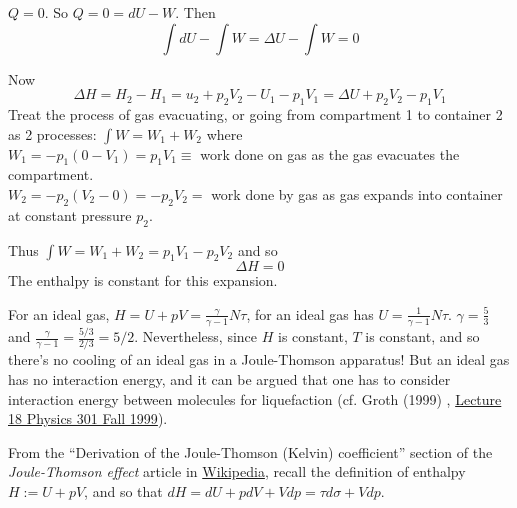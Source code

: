 \documentclass[10pt]{amsart}
\begin{document}
\begin{multicols*}{2}
$Q=0$.  So $Q=0 = dU -W$.  Then
\[
\int dU - \int W = \Delta U - \int W = 0 
\]

Now
\[
\Delta H = H_2 - H_1 = u_2 + p_2 V_2 - U_1 - p_1 V_1 = \Delta U + p_2 V_2 - p_1 V_1 
\]
Treat the process of gas evacuating, or going from compartment 1 to container 2 as 2 processes:  $\int W = W_1 + W_2$ where \\
$W_1 = -p_1 (0-V_1) = p_1 V_1 \equiv $ work done on gas as the gas evacuates the compartment. \\
$W_2 = -p_2(V_2-0) = -p_2 V_2 = $ work done by gas as gas expands into container at constant pressure $p_2$.  

Thus $\int W = W_1 + W_2 = p_1 V_1 - p_2 V_2$ and so 
\[
\boxed{ \Delta H = 0 }
\]
The enthalpy is constant for this expansion.  

For an ideal gas, $H= U + pV = \frac{\gamma}{\gamma -1} N\tau$, for an ideal gas has $U = \frac{1}{\gamma -1} N\tau$.  $\gamma = \frac{5}{3}$ and $\frac{\gamma}{\gamma-1} = \frac{5/3}{ 2/3} = 5/2$.  Nevertheless, since $H$ is constant, $T$ is constant, and so there's no cooling of an ideal gas in a Joule-Thomson apparatus!  But an ideal gas has no interaction energy, and it can be argued that one has to consider interaction energy between molecules for liquefaction (cf. Groth (1999) \cite{EGroth1999}, \href{http://grothserver.princeton.edu/~groth/phys301f99/lect18.pdf}{Lecture 18 Physics 301 Fall 1999}).  

From the ``Derivation of the Joule-Thomson (Kelvin) coefficient'' section of the \emph{Joule-Thomson effect} article in \href{https://en.wikipedia.org/wiki/Joule–Thomson_effect}{Wikipedia}, recall the definition of enthalpy $H:= U + pV$, and so that $dH= dU+ pdV + Vdp=\tau d\sigma + Vdp$.  


\end{multicols*}
\end{document}

